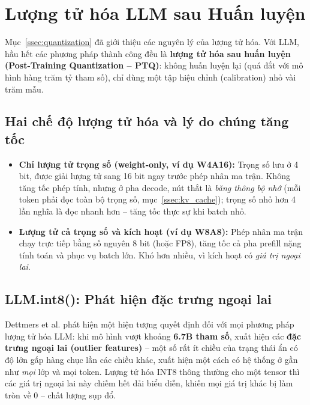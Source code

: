 
\section{Lượng tử hóa LLM sau Huấn luyện \newtag}
\label{sec:llm_quantization}

Mục~\ref{ssec:quantization} đã giới thiệu các nguyên lý của lượng tử hóa. Với LLM, hầu hết các phương pháp thành công đều là \textbf{lượng tử hóa sau huấn luyện (Post-Training Quantization -- PTQ)}: không huấn luyện lại (quá đắt với mô hình hàng trăm tỷ tham số), chỉ dùng một tập hiệu chỉnh (calibration) nhỏ vài trăm mẫu.

\subsection{Hai chế độ lượng tử hóa và lý do chúng tăng tốc}
\label{ssec:quant_regimes}
\begin{itemize}
	\item \textbf{Chỉ lượng tử trọng số (weight-only, ví dụ W4A16):} Trọng số lưu ở 4 bit, được giải lượng tử sang 16 bit ngay trước phép nhân ma trận. Không tăng tốc phép tính, nhưng ở pha decode, nút thắt là \emph{băng thông bộ nhớ} (mỗi token phải đọc toàn bộ trọng số, mục~\ref{ssec:kv_cache}); trọng số nhỏ hơn 4 lần nghĩa là đọc nhanh hơn -- tăng tốc thực sự khi batch nhỏ.
	\item \textbf{Lượng tử cả trọng số và kích hoạt (ví dụ W8A8):} Phép nhân ma trận chạy trực tiếp bằng số nguyên 8 bit (hoặc FP8), tăng tốc cả pha prefill nặng tính toán và phục vụ batch lớn. Khó hơn nhiều, vì kích hoạt có \emph{giá trị ngoại lai}.
\end{itemize}

\subsection{LLM.int8(): Phát hiện đặc trưng ngoại lai}
\label{ssec:llm_int8}
Dettmers et al. \cite{dettmers2022llmint8} phát hiện một hiện tượng quyết định đối với mọi phương pháp lượng tử hóa LLM: khi mô hình vượt khoảng \textbf{6.7B tham số}, xuất hiện các \textbf{đặc trưng ngoại lai (outlier features)} -- một số rất ít chiều của trạng thái ẩn có độ lớn gấp hàng chục lần các chiều khác, xuất hiện một cách có hệ thống ở gần như \emph{mọi} lớp và mọi token. Lượng tử hóa INT8 thông thường cho một tensor thì các giá trị ngoại lai này chiếm hết dải biểu diễn, khiến mọi giá trị khác bị làm tròn về 0 -- chất lượng sụp đổ.

